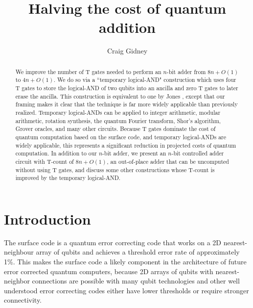 \documentclass[twocolumn]{quantumarticle-customized}
\begin{document}
\title{Halving the cost of quantum addition}
\author{Craig Gidney}

\begin{abstract}
We improve the number of T gates needed to perform an $n$-bit adder from $8n + O(1)$ \cite{Amy2013, Cuccaro2004, AustinDiscussionsAndEmails2017} to $4n + O(1)$.
We do so via a ``temporary logical-AND" construction which uses four T gates to store the logical-AND of two qubits into an ancilla and zero T gates to later erase the ancilla.
This construction is equivalent to one by Jones \cite{Jones2013}, except that our framing makes it clear that the technique is far more widely applicable than previously realized.
Temporary logical-ANDs can be applied to integer arithmetic, modular arithmetic, rotation synthesis, the quantum Fourier transform, Shor's algorithm, Grover oracles, and many other circuits.
Because T gates dominate the cost of quantum computation based on the surface code, and temporary logical-ANDs are widely applicable, this represents a significant reduction in projected costs of quantum computation.
In addition to our $n$-bit adder, we present an $n$-bit controlled adder circuit with T-count of $8n + O(1)$, an out-of-place adder that can be uncomputed without using T gates, and discuss some other constructions whose T-count is improved by the temporary logical-AND.
\end{abstract}

\maketitle

\section*{Introduction}

The surface code \cite{Brav98,Denn02,Raus07,Raus07d,Fowler2012} is a quantum error correcting code that works on a 2D nearest-neighbour array of qubits and achieves a threshold error rate of approximately 1\%.
This makes the surface code a likely component in the architecture of future error corrected quantum computers, because 2D arrays of qubits with nearest-neighbor connections are possible with many qubit technologies \cite{Schl11,Bare13,Gamb17,Leik17,Laht17} and other well understood error correcting codes either have lower thresholds or require stronger connectivity.
\end{document}
